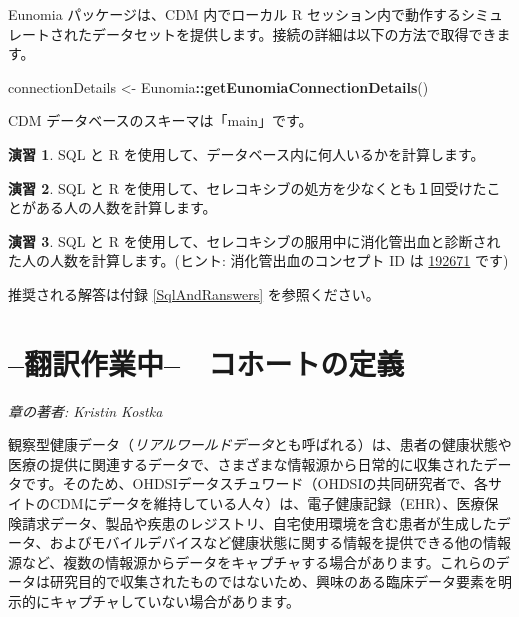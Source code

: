 \documentclass[
  11pt]{book}
\newenvironment{Shaded}{\begin{snugshade}}{\end{snugshade}}
\newcommand{\FunctionTok}[1]{\textcolor[rgb]{0.13,0.29,0.53}{\textbf{#1}}}
\newcommand{\NormalTok}[1]{#1}
\newcommand{\OtherTok}[1]{\textcolor[rgb]{0.56,0.35,0.01}{#1}}
\newcommand{\SpecialCharTok}[1]{\textcolor[rgb]{0.81,0.36,0.00}{\textbf{#1}}}
\theoremstyle{definition}
\theoremstyle{definition}
\theoremstyle{definition}
\newtheorem{exercise}{演習}[chapter]
\theoremstyle{definition}
\theoremstyle{remark}
\begin{document}
Eunomia パッケージは、CDM 内でローカル R セッション内で動作するシミュレートされたデータセットを提供します。接続の詳細は以下の方法で取得できます。

\begin{Shaded}
\begin{Highlighting}[]
\NormalTok{connectionDetails }\OtherTok{\textless{}{-}}\NormalTok{ Eunomia}\SpecialCharTok{::}\FunctionTok{getEunomiaConnectionDetails}\NormalTok{()}
\end{Highlighting}
\end{Shaded}

CDM データベースのスキーマは「main」です。

\begin{exercise}
\protect\hypertarget{exr:exercisePeopleCount}{}\label{exr:exercisePeopleCount}SQL と R を使用して、データベース内に何人いるかを計算します。
\end{exercise}

\begin{exercise}
\protect\hypertarget{exr:exerciseCelecoxibUsers}{}\label{exr:exerciseCelecoxibUsers}SQL と R を使用して、セレコキシブの処方を少なくとも１回受けたことがある人の人数を計算します。
\end{exercise}

\begin{exercise}
\protect\hypertarget{exr:exerciseGiBleedsDuringCelecoxib}{}\label{exr:exerciseGiBleedsDuringCelecoxib}SQL と R を使用して、セレコキシブの服用中に消化管出血と診断された人の人数を計算します。(ヒント: 消化管出血のコンセプト ID は \href{http://athena.ohdsi.org/search-terms/terms/192671}{192671} です)
\end{exercise}

推奨される解答は付録 \ref{SqlAndRanswers} を参照ください。

\chapter{--翻訳作業中--　コホートの定義}\label{Cohorts}

\emph{章の著者: Kristin Kostka}

観察型健康データ（\emph{リアルワールドデータ}とも呼ばれる）は、患者の健康状態や医療の提供に関連するデータで、さまざまな情報源から日常的に収集されたデータです。そのため、OHDSIデータスチュワード（OHDSIの共同研究者で、各サイトのCDMにデータを維持している人々）は、電子健康記録（EHR）、医療保険請求データ、製品や疾患のレジストリ、自宅使用環境を含む患者が生成したデータ、およびモバイルデバイスなど健康状態に関する情報を提供できる他の情報源など、複数の情報源からデータをキャプチャする場合があります。これらのデータは研究目的で収集されたものではないため、興味のある臨床データ要素を明示的にキャプチャしていない場合があります。
\end{document}
